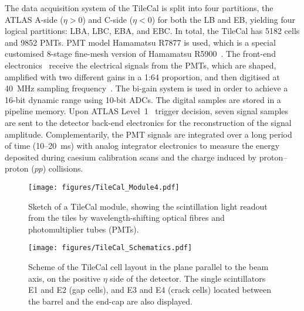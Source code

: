 The data acquisition system of the TileCal is split into four partitions, the ATLAS A-side ($\eta > 0$) and C-side ($\eta < 0$) for both the LB and EB, yielding four logical partitions: LBA, LBC, EBA, and EBC. In total, the TileCal has 5182 cells and 9852 PMTs. 
PMT model Hamamatsu R7877 is used, which is a special customised 8-stage fine-mesh version of Hamamatsu R5900~\cite{Crouau:1997tka}.  
The front-end electronics~\cite{Anderson:2005ym} receive the electrical signals from the PMTs, which are shaped, amplified with two different gains in a 1:64 proportion, and then digitised at 40~MHz sampling frequency~\cite{Berglund:2008zz}.
The bi-gain system is used in order to achieve a 16-bit dynamic range using 10-bit ADCs.
The digital samples are stored in a pipeline memory. Upon ATLAS Level~1~\cite{TRIG-2019-04} trigger decision, seven signal samples are sent to the detector back-end electronics for the reconstruction of the signal amplitude. Complementarily, the PMT signals are integrated over a long period of time (10--20~ms) with analog integrator electronics to measure the energy deposited during caesium calibration scans and the charge induced by proton--proton ($pp$) collisions.

\begin{figure}[htbp]
\begin{center}
    \texttt{[image: figures/TileCal\_Module4.pdf]}
    \caption{Sketch of a TileCal module, showing the scintillation light readout from the tiles by wavelength-shifting optical fibres and photomultiplier tubes (PMTs).}\label{fig:TileCalReadout}
\end{center}
\end{figure}


\begin{figure}[htbp]
\begin{center}
    \texttt{[image: figures/TileCal\_Schematics.pdf]}
    \caption{Scheme of the TileCal cell layout in the plane parallel to the beam axis, on the positive $\eta$ side of the detector. The single scintillators E1 and E2 (gap cells), and E3 and E4 (crack cells) located between the barrel and the end-cap are also displayed.}
\label{fig:TileCalSegmentation}
\end{center}
\end{figure}

